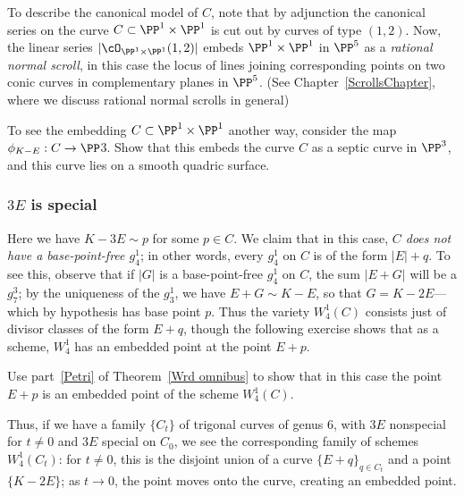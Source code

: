 To describe the canonical model of $C$, note that by adjunction the canonical series on the curve $C \subset \PP^1 \times \PP^1$ is cut out by curves of type $(1,2)$. Now, the linear series $|\cO_{\PP^1 \times \PP^1}(1,2)|$ embeds $\PP^1 \times \PP^1$ in $\PP^5$ as a \emph{rational normal scroll}, in this case the locus of lines joining corresponding points on two conic curves in complementary planes in $\PP^5$. (See Chapter~\ref{ScrollsChapter}, where we discuss rational normal scrolls in general)


\begin{exercise}
To see the embedding $C \subset \PP^1 \times \PP^1$ another way, consider the map $\phi_{K-E} : C \to \PP$3. Show that this embeds the curve $C$ as a septic curve in $\PP^3$, and this curve lies on a smooth quadric surface.
\end{exercise}

\subsubsection{$3E$ is special}  Here we have $K - 3E \sim p$ for some $p \in C$. We claim that in this case, \emph{$C$ does not have a base-point-free $g^1_4$}; in other words, every $g^1_4$ on $C$ is of the form $|E| + q$. To see this, observe that if $|G|$ is a base-point-free $g^1_4$ on $C$, the sum $|E+G|$ will be a $g^3_7$; by the uniqueness of the $g^1_3$, we have $E+G \sim K - E$, so that $G = K-2E$---which by hypothesis has base point $p$. Thus the variety $W^1_4(C)$ consists just of divisor classes of the form $E+q$, though the following exercise shows that as a scheme, $W^1_4$ has an embedded point at the point $E+p$.

\begin{exercise}
Use part~\ref{Petri} of Theorem~\ref{Wrd omnibus} to show that in this case the point $E+p$ is an embedded point of the scheme $W^1_4(C)$.
\end{exercise} 

Thus, if we have a family $\{C_t\}$ of trigonal curves of genus 6, with $3E$ nonspecial for $t \neq 0$ and $3E$ special on $C_0$, we see the corresponding family of schemes $W^1_4(C_t)$: for $t \neq 0$, this is the disjoint union of a curve $\{E+q\}_{q \in C_t}$ and a point $\{K-2E\}$; as $t \to 0$, the point moves onto the curve, creating an embedded point.

